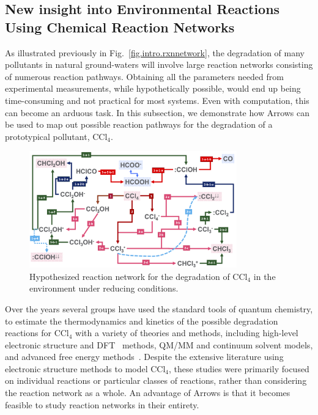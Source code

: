 \documentclass[runningheads,a4paper]{llncs}
\begin{document}
\subsection{New insight into Environmental Reactions Using Chemical Reaction Networks}
\label{subsection:enviro}

As illustrated previously in Fig.~\ref{fig.intro.rxnnetwork}, the degradation of many pollutants in natural ground-waters will involve large reaction networks consisting of numerous reaction pathways.  Obtaining all the parameters needed from experimental measurements, while hypothetically possible, would end up being time-consuming and not practical for most systems. Even with computation, this can become an arduous task.  In this subsection, we demonstrate how Arrows can be used to map out possible reaction pathways for the degradation of a prototypical pollutant, CCl$_4$. 

\begin{figure}[!H]
   \centering
   \includegraphics[angle=90,width=0.8\textwidth]{images/CCl4networks2.png}
   \caption{Hypothesized reaction network for the degradation of CCl$_4$ in the environment under reducing conditions.}
   \label{fig.enviro.ccl4network}
\end{figure}


Over the years several groups have used the standard tools of quantum chemistry, to estimate the thermodynamics and kinetics of the possible degradation reactions for CCl$_4$ with a variety of theories and methods, including high-level electronic structure and DFT~\cite{hohenberg1964inhomogeneous,kohn1965self} methods, QM/MM and continuum solvent models, and advanced free energy methods~\cite{kumaran1996ab,bylaska2000free,borisov2001systematic,bylaska2002one,bylaska2006estimating,valiev2008combined,feller2001extended,feller2003performance,chen2013water,robertson2002solvation,wang2012hybrid,koper1998theory,saveant1987simple,camaioni2009modeling}. Despite the extensive literature using electronic structure methods to model CCl$_4$, these studies were primarily focused on individual reactions or particular classes of reactions, rather than considering the reaction network as a whole. An advantage of Arrows is that it becomes feasible to study reaction networks in their entirety.  
\end{document}
